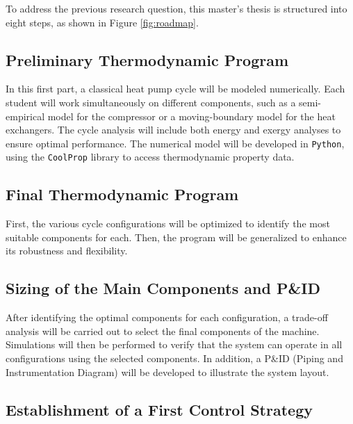 To address the previous research question, this master's 
thesis is structured into eight steps, as shown in Figure \ref{fig:roadmap}.

\subsection*{Preliminary Thermodynamic Program}

In this first part, a classical heat pump cycle will be modeled numerically. Each student will work 
simultaneously on different components, such as a semi-empirical model for the compressor 
or a moving-boundary model for the heat exchangers. The cycle analysis will include 
both energy and exergy analyses to ensure optimal performance. The numerical model will be developed in 
\texttt{Python}, using the \texttt{CoolProp} library to access thermodynamic property data.

\newpage

\subsection*{Final Thermodynamic Program}


First, the various cycle configurations will be optimized to identify the most 
suitable components for each. Then, the program will be generalized to enhance 
its robustness and flexibility.

\subsection*{Sizing of the Main Components and P\&ID}


After identifying the optimal components for each configuration, a trade-off analysis will be carried out to 
select the final components of the machine. 
Simulations will then be performed to verify that the system can operate in all 
configurations using the selected components. In addition, a P\&ID 
(Piping and Instrumentation Diagram) will be developed to illustrate the system layout.

\subsection*{Establishment of a First Control Strategy}

